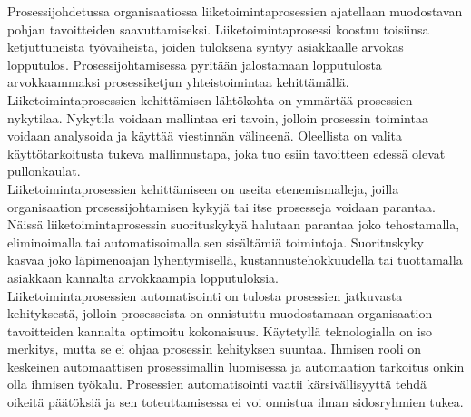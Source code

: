 \documentclass[finnish,12pt,a4paper,pdftex]{article}
\begin{document}
Prosessijohdetussa organisaatiossa liiketoimintaprosessien ajatellaan muodostavan pohjan tavoitteiden saavuttamiseksi. Liiketoimintaprosessi koostuu toisiinsa ketjuttuneista työvaiheista, joiden tuloksena syntyy asiakkaalle arvokas lopputulos. Prosessijohtamisessa pyritään jalostamaan lopputulosta arvokkaammaksi prosessiketjun yhteistoimintaa kehittämällä.\\

Liiketoimintaprosessien kehittämisen lähtökohta on ymmärtää prosessien nykytilaa. Nykytila voidaan mallintaa eri tavoin, jolloin prosessin toimintaa voidaan analysoida ja käyttää viestinnän välineenä. Oleellista on valita käyttötarkoitusta tukeva mallinnustapa, joka tuo esiin tavoitteen edessä olevat pullonkaulat.\\

Liiketoimintaprosessien kehittämiseen on useita etenemismalleja, joilla organisaation prosessijohtamisen kykyjä tai itse prosesseja voidaan parantaa. Näissä liiketoimintaprosessin suorituskykyä halutaan parantaa joko tehostamalla, eliminoimalla tai automatisoimalla sen sisältämiä toimintoja. Suorituskyky kasvaa joko läpimenoajan lyhentymisellä, kustannustehokkuudella tai tuottamalla asiakkaan kannalta arvokkaampia lopputuloksia. \\

Liiketoimintaprosessien automatisointi on tulosta prosessien jatkuvasta kehityksestä, jolloin prosesseista on onnistuttu muodostamaan organisaation tavoitteiden kannalta optimoitu kokonaisuus. Käytetyllä teknologialla on iso merkitys, mutta se ei ohjaa prosessin kehityksen suuntaa. Ihmisen rooli on keskeinen automaattisen prosessimallin luomisessa ja automaation tarkoitus onkin olla ihmisen työkalu. Prosessien automatisointi vaatii kärsivällisyyttä tehdä oikeitä päätöksiä ja sen toteuttamisessa ei voi onnistua ilman sidosryhmien tukea.


\end{document}
